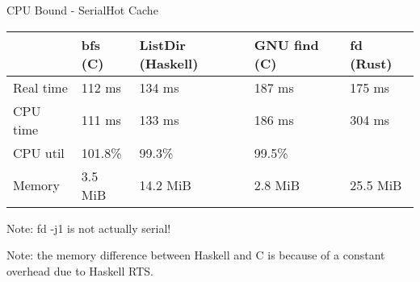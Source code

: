 \documentclass[17pt]{beamer}
\begin{document}
\begin{frame}{CPU Bound - Serial}{Hot Cache}
\scriptsize



\begin{tabular}{|l|l|l|l|l|}
\hline
  & bfs (C) & ListDir (Haskell) & GNU find (C) & fd (Rust) \\
\hline
  Real time & 112 ms & 134 ms & 187 ms & 175 ms \\
\hline
  CPU time & 111 ms & 133 ms & 186 ms & 304 ms \\
\hline
  CPU util & 101.8\% & 99.3\% & 99.5\% & \color{red}{173.7\%} \\
\hline
  Memory & 3.5 MiB & 14.2 MiB & 2.8 MiB & 25.5 MiB\\
\hline
\end{tabular}

Note: fd -j1 is not actually serial!

Note: the memory difference between Haskell and C is because of a constant
overhead due to Haskell RTS.

\end{frame}

%
\end{document}

